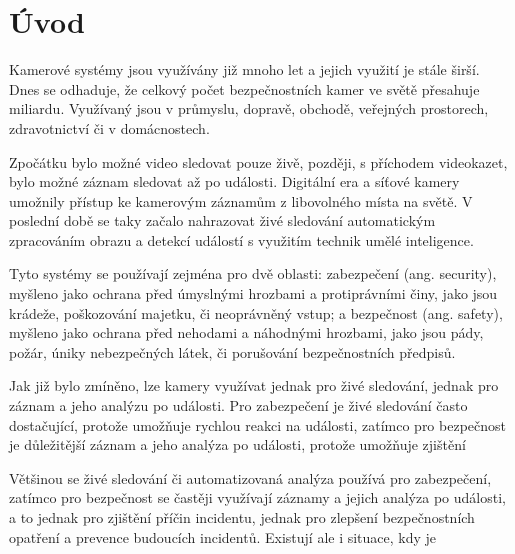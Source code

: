 \chapter{Úvod}
\label{sec:Introduction}

Kamerové systémy jsou využívány již mnoho let a jejich využití je stále širší.
Dnes se odhaduje, že celkový počet bezpečnostních kamer ve světě přesahuje
miliardu. Využívaný jsou v průmyslu, dopravě, obchodě, veřejných prostorech,
zdravotnictví či v domácnostech.

Zpočátku bylo možné video sledovat pouze živě, později, s příchodem videokazet,
bylo možné záznam sledovat až po události. Digitální era a síťové kamery
umožnily přístup ke kamerovým záznamům z libovolného místa na světě. V poslední
době se taky začalo nahrazovat živé sledování automatickým zpracováním obrazu a
detekcí událostí s využitím technik umělé inteligence.

Tyto systémy se používají zejména pro dvě oblasti: zabezpečení (ang. security),
myšleno jako ochrana před úmyslnými hrozbami a protiprávními činy, jako jsou
krádeže, poškozování majetku, či neoprávněný vstup; a bezpečnost (ang. safety),
myšleno jako ochrana před nehodami a náhodnými hrozbami, jako jsou pády, požár,
úniky nebezpečných látek, či porušování bezpečnostních předpisů.

Jak již bylo zmíněno, lze kamery využívat jednak pro živé sledování, jednak pro
záznam a jeho analýzu po události. Pro zabezpečení je živé sledování často
dostačující, protože umožňuje rychlou reakci na události, zatímco pro
bezpečnost je důležitější záznam a jeho analýza po události, protože umožňuje
zjištění

Většinou se živé sledování či automatizovaná analýza používá pro zabezpečení,
zatímco pro bezpečnost se častěji využívají záznamy a jejich analýza po
události, a to jednak pro zjištění příčin incidentu, jednak pro zlepšení
bezpečnostních opatření a prevence budoucích incidentů. Existují ale i situace,
kdy je

\endinput